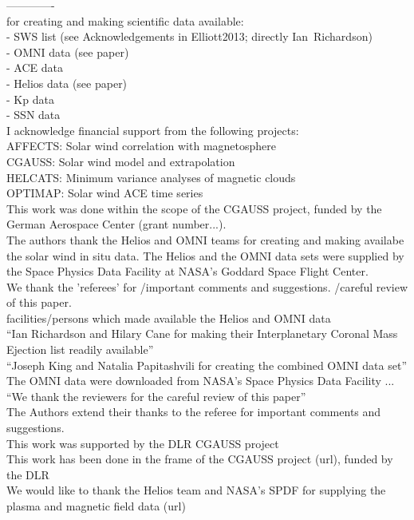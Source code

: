 -------------\\

for creating and making scientific data available:\\
- SWS list (see Acknowledgements in Elliott2013; directly Ian~Richardson)\\
- OMNI data (see paper)\\
- ACE data\\
- Helios data (see paper)\\
- Kp data\\
- SSN data\\

I acknowledge financial support from the following projects:\\
AFFECTS: Solar wind correlation with magnetosphere\\
CGAUSS: Solar wind model and extrapolation\\
HELCATS: Minimum variance analyses of magnetic clouds\\
OPTIMAP: Solar wind ACE time series\\


This work was done within the scope of the CGAUSS project, funded by the German Aerospace Center (grant number...).\\
The authors thank the Helios and OMNI teams for creating and making availabe the solar wind in situ data. The Helios and the OMNI data sets were supplied by the Space Physics Data Facility at NASA's Goddard Space Flight Center.\\
We thank the 'referees' for /important comments and suggestions. /careful review of this paper.\\

facilities/persons which made available the Helios and OMNI data\\
``Ian Richardson and Hilary Cane for making their Interplanetary Coronal Mass Ejection list readily available''\\
``Joseph King and Natalia Papitashvili for creating the combined OMNI data set''\\
The OMNI data were downloaded from NASA's Space Physics Data Facility ...\\
``We thank the reviewers for the careful review of this paper''\\
The Authors extend their thanks to the referee for important comments and suggestions.\\
This work was supported by the DLR CGAUSS project\\
This work has been done in the frame of the CGAUSS project (url), funded by the DLR\\
We would like to thank the Helios team and NASA's SPDF for supplying the plasma and magnetic field data (url)\\


